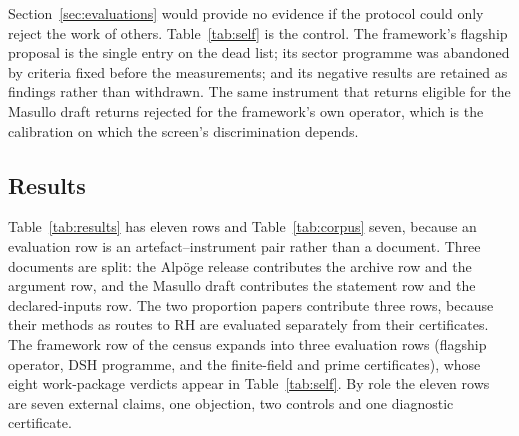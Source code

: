 \documentclass[11pt,a4paper]{article}
\newcommand{\RH}{\mathrm{RH}}
\newcommand{\verdict}[1]{\textsf{#1}}
\begin{document}
Section~\ref{sec:evaluations} would provide no evidence if the protocol could only reject
the work of others. Table~\ref{tab:self} is the control. The framework's flagship proposal is the
single entry on the dead list; its sector programme was abandoned by criteria fixed before the
measurements; and its negative results are retained as findings rather than withdrawn. The same
instrument that returns \verdict{eligible} for the Masullo draft returns \verdict{rejected} for the
framework's own operator, which is the calibration on which the screen's discrimination depends.

\subsection{Results}
\label{sec:results}

Table~\ref{tab:results} has eleven rows and Table~\ref{tab:corpus} seven, because an evaluation
row is an artefact--instrument pair rather than a document. Three documents are split: the
Alp\"oge release contributes the archive row and the argument row, and the Masullo draft
contributes the statement row and the declared-inputs row. The two proportion papers contribute
three rows, because their methods as routes to $\RH$ are evaluated separately from their
certificates. The framework row of the census expands into three evaluation rows (flagship
operator, DSH programme, and the finite-field and prime certificates), whose eight work-package
verdicts appear in Table~\ref{tab:self}. By role the eleven rows are seven external claims, one
objection, two controls and one diagnostic certificate.
\end{document}
